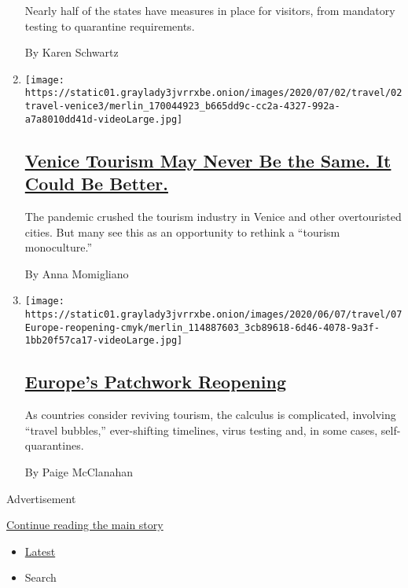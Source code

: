 \begin{enumerate}
  Nearly half of the states have measures in place for visitors, from
  mandatory testing to quarantine requirements.

  By Karen Schwartz
\item
  \texttt{[image: https://static01.graylady3jvrrxbe.onion/images/2020/07/02/travel/02travel-venice3/merlin\_170044923\_b665dd9c-cc2a-4327-992a-a7a8010dd41d-videoLarge.jpg]}

  \hypertarget{venice-tourism-may-never-be-the-same-it-could-be-better}{%
  \subsection{\texorpdfstring{\href{/2020/07/02/travel/venice-coronavirus-tourism.html}{Venice
  Tourism May Never Be the Same. It Could Be
  Better.}}{Venice Tourism May Never Be the Same. It Could Be Better.}}\label{venice-tourism-may-never-be-the-same-it-could-be-better}}

  The pandemic crushed the tourism industry in Venice and other
  overtouristed cities. But many see this as an opportunity to rethink a
  ``tourism monoculture.''

  By Anna Momigliano
\item
  \texttt{[image: https://static01.graylady3jvrrxbe.onion/images/2020/06/07/travel/07Europe-reopening-cmyk/merlin\_114887603\_3cb89618-6d46-4078-9a3f-1bb20f57ca17-videoLarge.jpg]}

  \hypertarget{europes-patchwork-reopening}{%
  \subsection{\texorpdfstring{\href{/2020/06/05/travel/europe-reopening-tourism-covid.html}{Europe's
  Patchwork
  Reopening}}{Europe's Patchwork Reopening}}\label{europes-patchwork-reopening}}

  As countries consider reviving tourism, the calculus is complicated,
  involving ``travel bubbles,'' ever-shifting timelines, virus testing
  and, in some cases, self-quarantines.

  By Paige McClanahan
\end{enumerate}

Advertisement

\protect\hyperlink{after-mid1}{Continue reading the main story}

\begin{itemize}
\tightlist
\item
  \protect\hyperlink{stream-panel}{Latest}
\item
  Search
\end{itemize}

